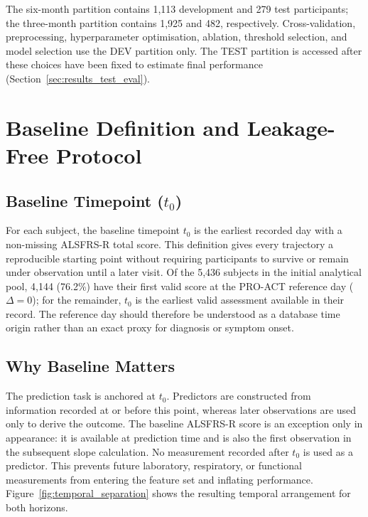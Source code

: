 The six-month partition contains 1,113 development and 279 test participants; the three-month partition contains 1,925 and 482, respectively. Cross-validation, preprocessing, hyperparameter optimisation, ablation, threshold selection, and model selection use the \gls{DEV} partition only. The \gls{TEST} partition is accessed after these choices have been fixed to estimate final performance (Section~\ref{sec:results_test_eval}).

\section{Baseline Definition and Leakage-Free Protocol}
\label{sec:methods_baseline}
\subsection{Baseline Timepoint ($t_0$)}
\label{sec:methods_t0}
For each subject, the baseline timepoint $t_0$ is the earliest recorded day with a non-missing \gls{ALSFRS-R} total score. This definition gives every trajectory a reproducible starting point without requiring participants to survive or remain under observation until a later visit. Of the 5,436 subjects in the initial analytical pool, 4,144 (76.2\%) have their first valid score at the \gls{PRO-ACT} reference day ($\Delta=0$); for the remainder, $t_0$ is the earliest valid assessment available in their record. The reference day should therefore be understood as a database time origin rather than an exact proxy for diagnosis or symptom onset.

\subsection{Why Baseline Matters}
\label{sec:methods_baseline_why}
The prediction task is anchored at $t_0$. Predictors are constructed from information recorded at or before this point, whereas later observations are used only to derive the outcome. The baseline \gls{ALSFRS-R} score is an exception only in appearance: it is available at prediction time and is also the first observation in the subsequent slope calculation. No measurement recorded after $t_0$ is used as a predictor. This prevents future laboratory, respiratory, or functional measurements from entering the feature set and inflating performance. Figure~\ref{fig:temporal_separation} shows the resulting temporal arrangement for both horizons.

